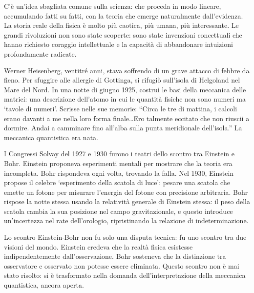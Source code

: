 \documentclass[12pt,a4paper,openany]{book}
\newcommand{\sezione}[1]{\vspace{1.2em}{\large\bfseries #1}\vspace{0.5em}\par}
\begin{document}
\sezione{Come nascono le rivoluzioni}

C'è un'idea sbagliata comune sulla scienza: che proceda in modo lineare, accumulando fatti su fatti, con la teoria che emerge naturalmente dall'evidenza. La storia reale della fisica è molto più caotica, più umana, più interessante. Le grandi rivoluzioni non sono state scoperte: sono state invenzioni concettuali che hanno richiesto coraggio intellettuale e la capacità di abbandonare intuizioni profondamente radicate.

\sezione{L'isola di Helgoland, luglio 1925}

Werner Heisenberg, ventitré anni, stava soffrendo di un grave attacco di febbre da fieno. Per sfuggire alle allergie di Gottinga, si rifugiò sull'isola di Helgoland nel Mare del Nord. In una notte di giugno 1925, costruì le basi della meccanica delle matrici: una descrizione dell'atomo in cui le quantità fisiche non sono numeri ma `tavole di numeri'. Scrisse nelle sue memorie: ``Circa le tre di mattina, i calcoli erano davanti a me nella loro forma finale\ldots Ero talmente eccitato che non riuscii a dormire. Andai a camminare fino all'alba sulla punta meridionale dell'isola.'' La meccanica quantistica era nata.

\sezione{Il conflitto delle interpretazioni}

I Congressi Solvay del 1927 e 1930 furono i teatri dello scontro tra Einstein e Bohr. Einstein proponeva esperimenti mentali per mostrare che la teoria era incompleta. Bohr rispondeva ogni volta, trovando la falla. Nel 1930, Einstein propose il celebre `esperimento della scatola di luce': pesare una scatola che emette un fotone per misurare l'energia del fotone con precisione arbitraria. Bohr rispose la notte stessa usando la relatività generale di Einstein stessa: il peso della scatola cambia la sua posizione nel campo gravitazionale, e questo introduce un'incertezza nel rate dell'orologio, ripristinando la relazione di indeterminazione.

Lo scontro Einstein-Bohr non fu solo una disputa tecnica: fu uno scontro tra due visioni del mondo. Einstein credeva che la realtà fisica esistesse indipendentemente dall'osservazione. Bohr sosteneva che la distinzione tra osservatore e osservato non potesse essere eliminata. Questo scontro non è mai stato risolto: si è trasformato nella domanda dell'interpretazione della meccanica quantistica, ancora aperta.

\sezione{Kuhn e la struttura delle rivoluzioni}
\end{document}
